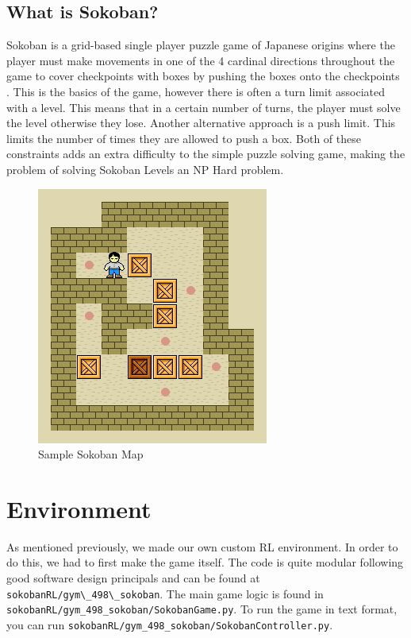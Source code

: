 \documentclass[twoside,11pt]{article}
\begin{document}
\subsection{What is Sokoban?}
Sokoban is a grid-based single player puzzle game of Japanese origins where the player must make movements in one of the 4 cardinal directions throughout the game to cover checkpoints with boxes by pushing the boxes onto the checkpoints \cite{sokoban_wiki}. This is the basics of the game, however there is often a turn limit associated with a level. This means that in a certain number of turns, the player must solve the level otherwise they lose. Another alternative approach is a push limit. This limits the number of times they are allowed to push a box. Both of these constraints adds an extra difficulty to the simple puzzle solving game, making the problem of solving Sokoban Levels an NP Hard problem.
\begin{figure}[h]
       \includegraphics[scale=0.5]{default_map-0.png}   
       \centering    
       \caption{Sample Sokoban Map}
\end{figure}

\section{Environment}
As mentioned previously, we made our own custom RL environment. In order to do this, we had to first make the game itself. The code is quite modular following good software design principals and can be found at \verb|sokobanRL/gym\_498\_sokoban|. The main game logic is found in \verb|sokobanRL/gym_498_sokoban/SokobanGame.py|. To run the game in text format, you can run 
\verb|sokobanRL/gym_498_sokoban/SokobanController.py|. 
\end{document}
